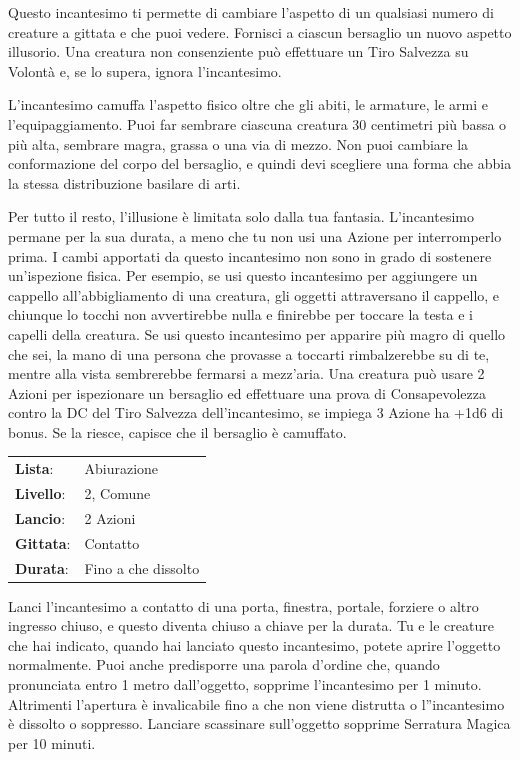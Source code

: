 \begin{multicols}{2}
Questo incantesimo ti permette di cambiare l'aspetto di un qualsiasi numero di creature a gittata e che puoi vedere. Fornisci a ciascun bersaglio un nuovo aspetto illusorio. Una creatura non consenziente può effettuare un Tiro Salvezza su Volontà e, se lo supera, ignora l'incantesimo.

L'incantesimo camuffa l'aspetto fisico oltre che gli abiti, le armature, le armi e l'equipaggiamento. Puoi far sembrare ciascuna creatura 30 centimetri più bassa o più alta, sembrare magra, grassa o una via di mezzo. Non puoi cambiare la conformazione del corpo del bersaglio, e quindi devi scegliere una forma che abbia la stessa distribuzione basilare di arti.

Per tutto il resto, l'illusione è limitata solo dalla tua fantasia. L'incantesimo permane per la sua durata, a meno che tu non usi una Azione per interromperlo prima. I cambi apportati da questo incantesimo non sono in grado di sostenere un'ispezione fisica. Per esempio, se usi questo incantesimo per aggiungere un cappello all'abbigliamento di una creatura, gli oggetti attraversano il cappello, e chiunque lo tocchi non avvertirebbe nulla e finirebbe per toccare la testa e i capelli della creatura.
Se usi questo incantesimo per apparire più magro di quello che sei, la mano di una persona che provasse a toccarti rimbalzerebbe su di te, mentre alla vista sembrerebbe fermarsi a mezz'aria. Una creatura può usare 2 Azioni per ispezionare un bersaglio ed effettuare una prova di Consapevolezza contro la DC del Tiro Salvezza dell'incantesimo, se impiega 3 Azione ha +1d6 di bonus. Se la riesce, capisce che il bersaglio è camuffato.

\noindent\begin{tabularx}{\linewidth}{p{1.3cm}X}
	\rowcolor{gray!20}\textbf{Lista}: & Abiurazione \\
	\textbf{Livello}: & 2, Comune \\
	\rowcolor{gray!20}\textbf{Lancio}: & 2 Azioni \\
	\textbf{Gittata}: & Contatto \\
	\rowcolor{gray!20}\textbf{Durata}: & Fino a che dissolto \\
\end{tabularx}\smallskip

\label{Arcane Lock}Lanci l'incantesimo a contatto di una porta, finestra, portale, forziere o altro ingresso chiuso, e questo diventa chiuso a chiave per la durata. Tu e le creature che hai indicato, quando hai lanciato questo incantesimo, potete aprire l'oggetto normalmente. Puoi anche predisporre una parola d'ordine che, quando pronunciata entro 1 metro dall'oggetto, sopprime l'incantesimo per 1 minuto. Altrimenti l'apertura è invalicabile fino a che non viene distrutta o l''incantesimo è dissolto o soppresso. Lanciare scassinare sull'oggetto sopprime Serratura Magica per 10 minuti.


\end{multicols}
